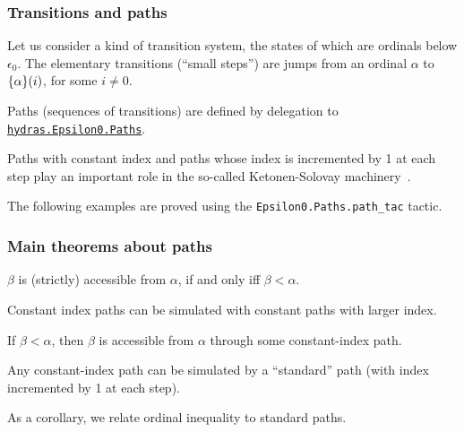 \subsubsection{Transitions and paths}
Let us consider a kind of transition system, the states of which are ordinals below $\epsilon_0$. The elementary transitions (``small steps'') are jumps from an ordinal $\alpha$ to $\mbox{$\{\alpha\}(i)$}$, for some $i\not=0$.


Paths (sequences of transitions) are defined by delegation to
\href{../theories/html/hydras.Epsilon0.Paths.html}%
{\texttt{hydras.Epsilon0.Paths}}.


 Paths with constant index and paths whose index is incremented by 1 at each step play an important role in the so-called Ketonen-Solovay machinery~\cite{KS81}.


The following examples are proved using the \texttt{Epsilon0.Paths.path\_tac} tactic.

 
\subsubsection{Main theorems about paths}

$\beta$ is (strictly) accessible from $\alpha$, if and only iff
$\beta<\alpha$.


Constant index paths can be simulated with constant paths with larger index.
 


If $\beta<\alpha$, then $\beta$ is accessible from $\alpha$
through some constant-index path.


Any constant-index path can be simulated by a ``standard'' path (with index incremented by 1 at each step).


As a corollary, we relate ordinal inequality to standard paths.





